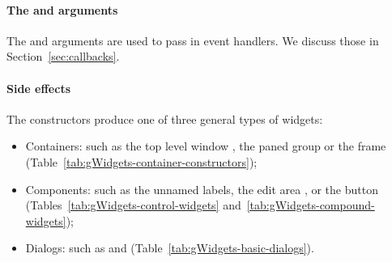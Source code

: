 \paragraph{The  and  arguments}
The  and  arguments are used to pass in
event handlers. We discuss those in Section~\ref{sec:callbacks}.


\paragraph{Side effects}
The constructors produce one of three general types of widgets:
\\

\begin{itemize}
\item Containers: such as the top level window , the paned
  group  or the frame 
 (Table~\ref{tab:gWidgets-container-constructors});
%
\item Components: such as the unnamed labels, the edit area
  , or the button 
  (Tables~\ref{tab:gWidgets-control-widgets}
  and~\ref{tab:gWidgets-compound-widgets});
%
\item Dialogs: such as  and  (Table~\ref{tab:gWidgets-basic-dialogs}).
\end{itemize}







